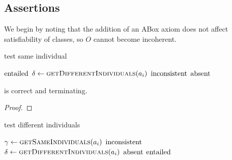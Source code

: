 \documentclass[paper.tex]{subfiles}
\begin{document}
\subsection{Assertions}
\label{sec:algorithms:assert}

We begin by noting that the addition of an ABox axiom does not affect satisfiability of classes, so $O$ cannot become incoherent.

\todo[notation]

\begin{algorithm}[H]
  \caption{test same individual}
  \begin{algorithmic}[1]
    \raggedright
        \State \Return $\mathrm{entailed}$
      \Else
          \State $\delta \gets \Call{getDifferentIndividuals}{a_i}$
            \State \Return $\mathrm{inconsistent}$
          \EndIf
        \EndFor
        \State \Return $\mathrm{absent}$
      \EndIf
    \EndFunction
  \end{algorithmic}
\end{algorithm}

\begin{theorem}
   is correct and terminating.
\end{theorem}
\begin{proof}
  \todo
\end{proof}


\begin{algorithm}[H]
  \caption{test different individuals}
  \begin{algorithmic}[1]
    \raggedright
        \State $\gamma \gets \Call{getSameIndividuals}{a_i}$
          \State \Return $\mathrm{inconsistent}$
        \EndIf
      \EndFor
        \State $\delta \gets \Call{getDifferentIndividuals}{a_i}$
          \State \Return $\mathrm{absent}$
        \EndIf
      \EndFor
      \State \Return $\mathrm{entailed}$
    \EndFunction
  \end{algorithmic}
\end{algorithm}
\end{document}
